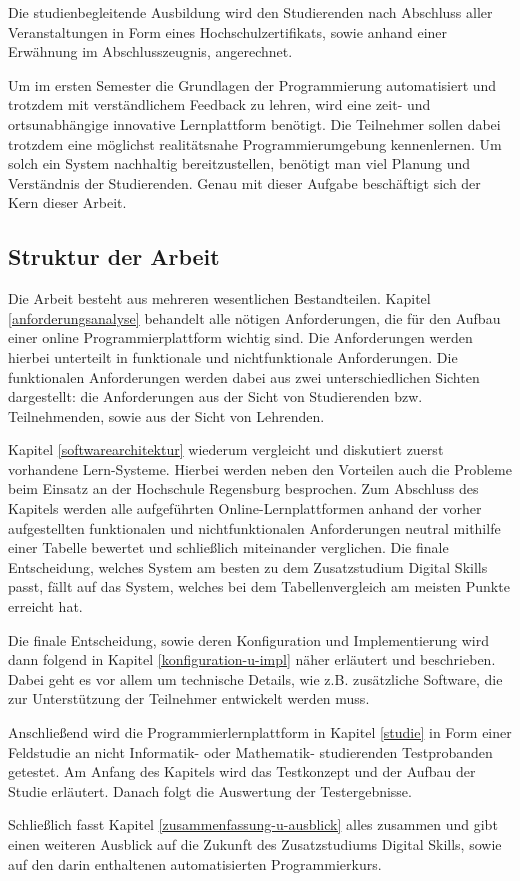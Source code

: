 Die studienbegleitende Ausbildung wird den Studierenden nach Abschluss aller
Veranstaltungen in Form eines Hochschulzertifikats, sowie anhand einer Erwähnung
im Abschlusszeugnis, angerechnet.

Um im ersten Semester die Grundlagen der Programmierung automatisiert und
trotzdem mit verständlichem Feedback zu lehren, wird eine zeit- und
ortsunabhängige innovative Lernplattform benötigt. Die Teilnehmer sollen dabei
trotzdem eine möglichst realitätsnahe Programmierumgebung kennenlernen. Um solch
ein System nachhaltig bereitzustellen, benötigt man viel Planung und Verständnis
der Studierenden. Genau mit dieser Aufgabe beschäftigt sich der Kern dieser
Arbeit.

\subsection{Struktur der Arbeit}\label{struktur-der-arbeit}
Die Arbeit besteht aus mehreren wesentlichen Bestandteilen. Kapitel
\ref{anforderungsanalyse} behandelt alle nötigen Anforderungen, die für den
Aufbau einer online Programmierplattform wichtig sind. Die Anforderungen werden
hierbei unterteilt in funktionale und nichtfunktionale Anforderungen. Die
funktionalen Anforderungen werden dabei aus zwei unterschiedlichen Sichten
dargestellt: die Anforderungen aus der Sicht von Studierenden bzw.
Teilnehmenden, sowie aus der Sicht von Lehrenden.

Kapitel \ref{softwarearchitektur} wiederum vergleicht und diskutiert zuerst
vorhandene Lern-Systeme. Hierbei werden neben den Vorteilen auch die Probleme
beim Einsatz an der Hochschule Regensburg besprochen. Zum Abschluss des Kapitels
werden alle aufgeführten Online-Lernplattformen anhand der vorher aufgestellten
funktionalen und nichtfunktionalen Anforderungen neutral mithilfe einer Tabelle
bewertet und schließlich miteinander verglichen. Die finale Entscheidung,
welches System am besten zu dem Zusatzstudium Digital Skills passt, fällt auf
das System, welches bei dem Tabellenvergleich am meisten Punkte erreicht hat.

Die finale Entscheidung, sowie deren Konfiguration und Implementierung wird
dann folgend in Kapitel \ref{konfiguration-u-impl} näher erläutert und
beschrieben. Dabei geht es vor allem um technische Details, wie z.B. zusätzliche
Software, die zur Unterstützung der Teilnehmer entwickelt werden muss.

Anschließend wird die Programmierlernplattform in Kapitel \ref{studie} in Form
einer Feldstudie an nicht Informatik- oder Mathematik- studierenden
Testprobanden getestet. Am Anfang des Kapitels wird das Testkonzept und der
Aufbau der Studie erläutert. Danach folgt die Auswertung der Testergebnisse.

Schließlich fasst Kapitel \ref{zusammenfassung-u-ausblick} alles zusammen und
gibt einen weiteren Ausblick auf die Zukunft des Zusatzstudiums Digital Skills,
sowie auf den darin enthaltenen automatisierten Programmierkurs.